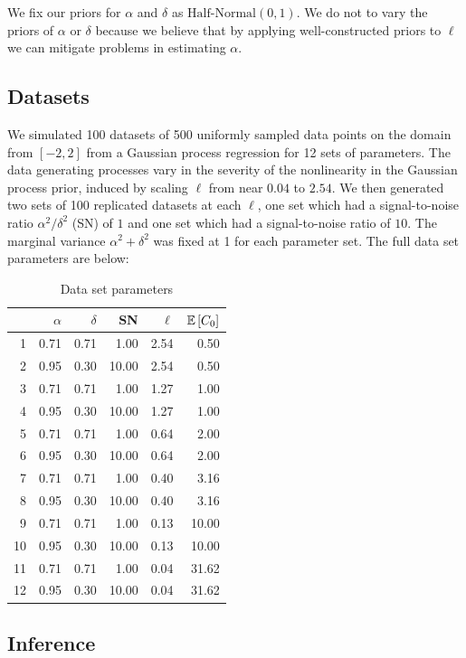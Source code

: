 \documentclass{article}
\newcommand{\Exp}[1]{\ensuremath{\mathbb{E} \lb #1 \rb}}
\newcommand{\lb}{\ensuremath{\left[}}
\newcommand{\rb}{\ensuremath{\right]}}
\begin{document}
We fix our priors for $\alpha$ and $\delta$ as $\text{Half-Normal}(0, 1)$. We
do not to vary the priors of $\alpha$ or $\delta$ because we believe that by
applying well-constructed priors to $\ell$ we can mitigate problems in
estimating $\alpha$. 

\subsection{Datasets}

We simulated 100 datasets of 500 uniformly sampled data points on the domain
from $[-2, 2]$ from a Gaussian process regression for 12 sets of parameters.
The data generating processes vary in the severity of the nonlinearity in the
Gaussian process prior, induced by scaling $\ell$ from near $0.04$ to $2.54$.
We then generated two sets of 100 replicated datasets at each $\ell$, one set
which had a signal-to-noise ratio $\alpha ^ 2/ \delta ^ 2$ (SN) of $1$ and one
set which had a signal-to-noise ratio of $10$. The marginal variance $\alpha ^
2 + \delta ^ 2$ was fixed at 1 for each parameter set. The full data set
parameters are below:
\begin{table}[ht]
\centering
\caption{Data set parameters}
\begin{tabular}{rrrrrr}
  \hline
  & $\alpha$ & $\delta$ & SN & $\ell$ & $\Exp{C_0}$ \\ 
  \hline
1 & 0.71 & 0.71 & 1.00 & 2.54 & 0.50 \\ 
  2 & 0.95 & 0.30 & 10.00 & 2.54 & 0.50 \\ 
  3 & 0.71 & 0.71 & 1.00 & 1.27 & 1.00 \\ 
  4 & 0.95 & 0.30 & 10.00 & 1.27 & 1.00 \\ 
  5 & 0.71 & 0.71 & 1.00 & 0.64 & 2.00 \\ 
  6 & 0.95 & 0.30 & 10.00 & 0.64 & 2.00 \\ 
  7 & 0.71 & 0.71 & 1.00 & 0.40 & 3.16 \\ 
  8 & 0.95 & 0.30 & 10.00 & 0.40 & 3.16 \\ 
  9 & 0.71 & 0.71 & 1.00 & 0.13 & 10.00 \\ 
  10 & 0.95 & 0.30 & 10.00 & 0.13 & 10.00 \\ 
  11 & 0.71 & 0.71 & 1.00 & 0.04 & 31.62 \\ 
  12 & 0.95 & 0.30 & 10.00 & 0.04 & 31.62 \\ 
   \hline
\end{tabular}
\end{table}
\subsection{Inference}
\end{document}
